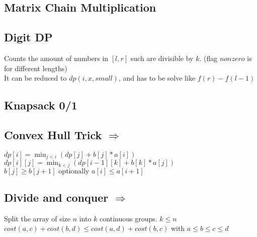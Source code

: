 

\subsection{Matrix Chain Multiplication}

\subsection{Digit DP} 
\vspace{-5pt}
Counts the amount of numbers in $[l, r]$ such are divisible by $k$. (flag $nonzero$ is for different lengths)  \\
It can be reduced to $dp(i, x, small)$, and has to be solve like $f(r) - f(l - 1)$ \\
\vspace{-5pt}
\vspace{-15pt}

\subsection{Knapsack 0/1}

\subsection{Convex Hull Trick  $\Rightarrow$ }
$ dp[i] = \min_{j < i}(dp[j] + b[j] * a[i]) $ \\
$ dp[i][j] = \min_{k < j}(dp[i - 1][k] + b[k] * a[j]) $ \\
$ b[j] \geq b[j + 1] \text{ optionally } a[i] \leq a[i + 1] $ \\ 

\subsection{Divide and conquer  $\Rightarrow$  } 
Split the array of size $n$ into $k$ continuous groups. $k \leq n$ \\
$ cost(a, c) + cost(b, d) \leq cost(a, d) + cost(b, c)$ with $a \leq b \leq c \leq d$ \\

